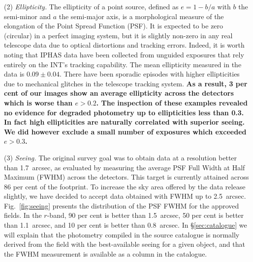 \documentclass[a4paper,useAMS,usenatbib]{mn2e}
\begin{document}
(2) \emph{Ellipticity.} 
The ellipticity of a point source,
defined as $e = 1 - b / a$ 
with $b$ the semi-minor and $a$ the semi-major axis,
is a morphological measure of the elongation
of the Point Spread Function (PSF).
It is expected to be zero (circular)
in a perfect imaging system,
but it is slightly non-zero in any real telescope data 
due to optical distortions and tracking errors.
Indeed, it is worth noting
that IPHAS data have been collected
from unguided exposures that rely entirely
on the INT's tracking capability.
The mean ellipticity measured
in the data is $0.09\pm0.04$.
There have been sporadic episodes with higher ellipticities
due to mechanical glitches in the telescope tracking system.
{ \bf As a result, 3 per cent of our images show an
average ellipticity across the detectors which is worse
than $e > 0.2$.
The inspection of these examples revealed no evidence for
degraded photometry up to ellipticities less than 0.3.
In fact high ellipticities are naturally correlated with superior seeing.
We did however exclude a small number of exposures
which exceeded $e > 0.3$.}

(3) \emph{Seeing.} 
The original survey goal was to obtain data 
at a resolution better than 1.7~arcsec,
as evaluated by measuring the average PSF Full Width at Half Maximum (FWHM)
across the detectors.
This target is currently attained across 86 per cent of the footprint.
To increase the sky area offered by the data release slightly,
we have decided to accept data obtained with FWHM up to 2.5~arcsec.
Fig.~\ref{fig:seeing} presents the distribution
of the PSF FWHM for the approved fields.
In the $r$-band, 90 per cent is better than 1.5~arcsec,
50 per cent is better than 1.1~arcsec,
and 10 per cent is better than 0.8~arcsec.
In \S\ref{sec:catalogue} we will explain
that the photometry compiled in the source catalogue
is normally derived from the field with the
best-available seeing for a given object,
and that the FWHM measurement
is available as a column in the catalogue.
\end{document}
